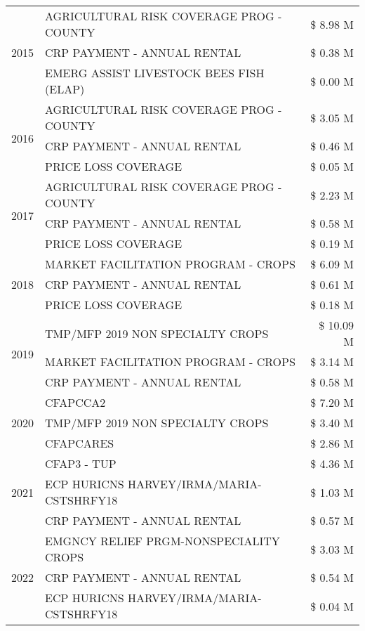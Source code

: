 \begin{tabular}{llr}
\cline{1-3}
\multirow[t]{3}{*}{2015} & AGRICULTURAL RISK COVERAGE PROG - COUNTY & \$ 8.98 M \\
 & CRP PAYMENT - ANNUAL RENTAL & \$ 0.38 M \\
 & EMERG ASSIST LIVESTOCK BEES FISH (ELAP) & \$ 0.00 M \\
\cline{1-3}
\multirow[t]{3}{*}{2016} & AGRICULTURAL RISK COVERAGE PROG - COUNTY & \$ 3.05 M \\
 & CRP PAYMENT - ANNUAL RENTAL & \$ 0.46 M \\
 & PRICE LOSS COVERAGE & \$ 0.05 M \\
\cline{1-3}
\multirow[t]{3}{*}{2017} & AGRICULTURAL RISK COVERAGE PROG - COUNTY & \$ 2.23 M \\
 & CRP PAYMENT - ANNUAL RENTAL & \$ 0.58 M \\
 & PRICE LOSS COVERAGE & \$ 0.19 M \\
\cline{1-3}
\multirow[t]{3}{*}{2018} & MARKET FACILITATION PROGRAM - CROPS & \$ 6.09 M \\
 & CRP PAYMENT - ANNUAL RENTAL & \$ 0.61 M \\
 & PRICE LOSS COVERAGE & \$ 0.18 M \\
\cline{1-3}
\multirow[t]{3}{*}{2019} & TMP/MFP 2019 NON SPECIALTY CROPS & \$ 10.09 M \\
 & MARKET FACILITATION PROGRAM - CROPS & \$ 3.14 M \\
 & CRP PAYMENT - ANNUAL RENTAL & \$ 0.58 M \\
\cline{1-3}
\multirow[t]{3}{*}{2020} & CFAPCCA2 & \$ 7.20 M \\
 & TMP/MFP 2019 NON SPECIALTY CROPS & \$ 3.40 M \\
 & CFAPCARES & \$ 2.86 M \\
\cline{1-3}
\multirow[t]{3}{*}{2021} & CFAP3 - TUP & \$ 4.36 M \\
 & ECP HURICNS HARVEY/IRMA/MARIA-CSTSHRFY18 & \$ 1.03 M \\
 & CRP PAYMENT - ANNUAL RENTAL & \$ 0.57 M \\
\cline{1-3}
\multirow[t]{3}{*}{2022} & EMGNCY RELIEF PRGM-NONSPECIALITY CROPS & \$ 3.03 M \\
 & CRP PAYMENT - ANNUAL RENTAL & \$ 0.54 M \\
 & ECP HURICNS HARVEY/IRMA/MARIA-CSTSHRFY18 & \$ 0.04 M \\
\cline{1-3}
\bottomrule
\end{tabular}
